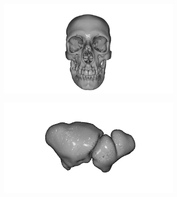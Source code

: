 \begin{figure}[htp]
  \centering
  \begin{subfigure}[b]{0.40\textwidth}
  \centering 
  \includegraphics[width=\textwidth]{imagenes/chapter4/Craneo12018377.png}
  \end{subfigure}
  \begin{subfigure}[b]{0.40\textwidth}
  \centering 
  \includegraphics[width=\textwidth]{imagenes/chapter4/SenoFrontal100205.png}
  \end{subfigure}


\end{figure}
